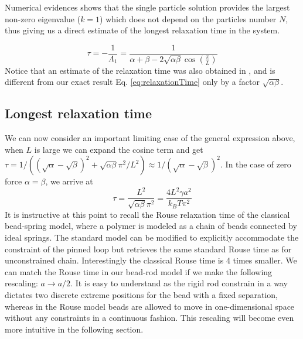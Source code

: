 \documentclass[aps,showpacs,twocolumn,floatfix,prx,superscriptaddress]{revtex4-1}
\begin{document}
Numerical evidences shows that the single particle solution provides the largest non-zero eigenvalue ($k=1$) which does not depend on the particles number $N$, thus giving us a direct estimate of the longest relaxation time in the system.  


\begin{equation}
    \label{eq:relaxationTime}
    \tau = -\frac{1}{\Lambda_1} = \frac{1}{\alpha+\beta-2\sqrt{\alpha\beta}\cos(\frac{\pi}{L})}
\end{equation}
Notice that an estimate of the relaxation time was also obtained in \cite{Sandow1994}, and is different from our exact result Eq. \eqref{eq:relaxationTime} only by a factor $\sqrt{\alpha\beta}$. 

\subsection{Longest relaxation time}
We can now consider an important limiting case of the general expression above, when $L$ is large we can expand the cosine term and get $\tau = 1/\left((\sqrt{\alpha}-\sqrt{\beta})^2 + \sqrt{\alpha\beta}\pi^2/L^2\right)\approx 1/(\sqrt{\alpha}-\sqrt{\beta})^2$. In the case of zero force $\alpha=\beta$, we arrive at
\begin{equation}
\tau=\frac{L^2}{\sqrt{\alpha\beta}\pi^2}=\frac{4L^2\gamma a^2}{k_{B}T\pi^2}
\end{equation} It is instructive at this point to recall the Rouse relaxation time of the classical bead-spring model, where a polymer is modeled as a chain of beads connected by ideal springs. The standard model \cite{Doi1988} can be modified to explicitly accommodate the constraint of the pinned loop but retrieves the same standard Rouse time as for unconstrained chain. Interestingly the classical Rouse time is 4 times smaller. We can match the Rouse time in our bead-rod model if we make the following rescaling: $a\rightarrow a/2$. It is easy to understand as the rigid rod constrain in a way dictates two discrete extreme positions for the bead with a fixed separation, whereas in the Rouse model beads are allowed to move in one-dimensional space without any constraints in a continuous fashion. This rescaling will become even more intuitive in the following section.
\end{document}
